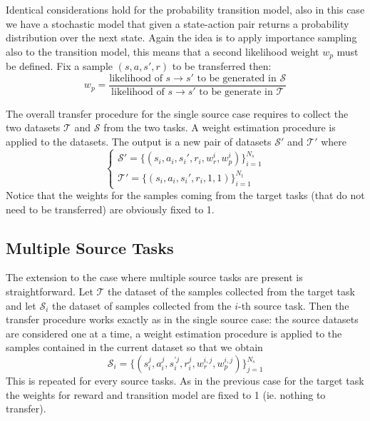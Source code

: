   \noindent Identical considerations hold for the probability transition model, also in this case we have
  a stochastic model that given a state-action pair returns a probability distribution over the next state.\newline
  Again the idea is to apply importance sampling also to the transition model, this means that a second
  likelihood weight $w_p$ must be defined. Fix a sample $(s,a,s',r)$ to be transferred then:
  \begin{equation}
      w_{p} = \frac{\text{likelihood of $s \rightarrow s'$ to be generated in }\mathcal{S}}{\text{likelihood of $s \rightarrow s'$ to be generate in }\mathcal{T}}
  \end{equation}

  \noindent The overall transfer procedure for the single source case requires to collect the two datasets $\mathcal{T}$ and $\mathcal{S}$ from
  the two tasks. A weight estimation procedure is applied to the datasets. The output is a new pair of datasets $\mathcal{S}'$ and $\mathcal{T}'$ where
  \begin{equation*}
    \begin{cases}
      \mathcal{S}' = \{ (s_{i},a_{i},s_{i}',r_{i},w_{r}^{i},w_{p}^{i}) \}_{i=1}^{N_s} \\
      \mathcal{T}' = \{ (s_{i},a_{i},s_{i}',r_{i},1,1) \}_{i=1}^{N_t}
    \end{cases}
  \end{equation*}
  Notice that the weights for the samples coming from the target tasks (that do not need to be transferred) are
  obviously fixed to 1.

\subsection{Multiple Source Tasks}
  \noindent The extension to the case where multiple source tasks are present is straightforward. Let $\mathcal{T}$ the dataset of the samples
  collected from the target task and let $\mathcal{S}_i$ the dataset of samples collected from the $i$-th source task.\newline
  Then the transfer procedure works exactly as in the single source case: the source datasets are considered one at a time,
  a weight estimation procedure is applied to the samples contained in the current dataset so that we obtain
  \begin{equation*}
    \mathcal{S}_{i} = \{ (s_{i}^{j}, a_{i}^{j}, s_{i}^{'j}, r_{i}^{j}, w_{r}^{i,j}, w_{p}^{i,j}) \}_{j=1}^{N_{s}}
  \end{equation*}
  This is repeated for every source tasks. As in the previous case for the target task the weights for reward and
  transition model are fixed to 1 (ie. nothing to transfer).\newline

